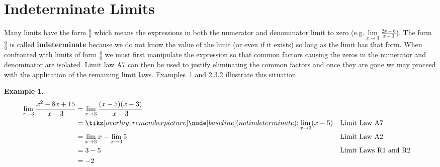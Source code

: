\documentclass[12pt,]{book}
\newcommand{\terminology}[1]{\textbf{#1}}
\theoremstyle{plain}
\theoremstyle{definition}
\newtheorem{example}[theorem]{Example}
\numberwithin{equation}{section}
\newcommand{\tikzmark}[1]{\tikz[overlay,remember picture] \node[baseline] (#1) {};}%
\begin{document}
\section[Indeterminate Limits]{Indeterminate Limits}\label{section-indeterminate-limits}
Many limits have the form \(\frac{0}{0}\) which means the expressions in both the numerator and denominator limit to zero (e.g.\@\(\lim\limits_{x\to3}\frac{2x-6}{x-3}\)). The form \(\frac{0}{0}\) is called \terminology{indeterminate} because we do not know the value of the limit (or even if it exists) so long as the limit has that form. When confronted with limits of form \(\frac{0}{0}\) we must first manipulate the expression so that common factors causing the zeros in the numerator and denominator are isolated. Limit law A7 can then be used to justify eliminating the common factors and once they are gone we may proceed with the application of the remaining limit laws. \hyperref[example-first-indeterminate]{Examples~\ref*{example-first-indeterminate}} and \hyperref[example-second-indeterminate]{2.3.2} illustrate this situation.%
\begin{example}\label{example-first-indeterminate}
\begin{align*}
\lim_{x\to3}\frac{x^2-8x+15}{x-3}&=\lim_{x\to3}\frac{(x-5)(x-3)}{x-3}\\
&=\tikzmark{not indeterminate}\lim_{x\to3}(x-5)&&\text{Limit Law A7}\\
&=\lim_{x\to3}x-\lim_{x\to3}5&&\text{Limit Law A2}\\
&=3-5&&\text{Limit Laws R1 and R2}\\
&=-2
\end{align*}%
\end{example}
\end{document}
